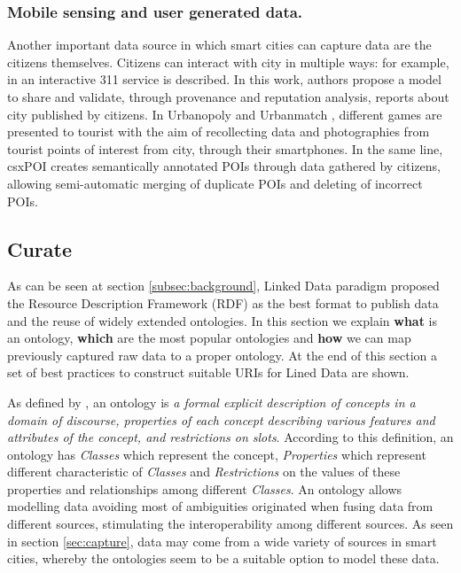 \subsubsection{Mobile sensing and user generated data.} Another important data source in which smart cities can capture data are the citizens themselves. Citizens can interact with city in multiple ways: for example, in \cite{emalditrust} an interactive 311 service is described. In this work, authors propose a model to share and validate, through provenance and reputation analysis, reports about city published by citizens. In Urbanopoly \cite{celino_urbanopoly_2012} and Urbanmatch \cite{celino_urbanmatch_2012}, different games are presented to tourist with the aim of recollecting data and photographies from tourist points of interest from city, through their smartphones. In the same line, csxPOI \cite{braun_collaborative_2010} creates semantically annotated POIs through data gathered by citizens, allowing semi-automatic merging of duplicate POIs and deleting of incorrect POIs.

\subsection{Curate}
\label{subsec:process}

As can be seen at section \ref{subsec:background}, Linked Data paradigm proposed the Resource Description Framework (RDF) as the best format to publish data and the reuse of widely extended ontologies. In this section we explain \textbf{what} is an ontology, \textbf{which} are the most popular ontologies and \textbf{how} we can map previously captured raw data to a proper ontology. At the end of this section a set of best practices to construct suitable URIs for Lined Data are shown.

As defined by \cite{noy_ontology_2001}, an ontology is \textit{a formal explicit description of concepts in a domain of discourse, properties of each concept describing various features and attributes of the concept, and restrictions on slots}. According to this definition, an ontology has \textit{Classes} which represent the concept, \textit{Properties} which represent different characteristic of \textit{Classes} and \textit{Restrictions} on the values of these properties and relationships among different \textit{Classes}. An ontology allows modelling data avoiding most of ambiguities originated when fusing data from different sources, stimulating the interoperability among different sources. As seen in section \ref{sec:capture}, data may come from a wide variety of sources in smart cities, whereby the ontologies seem to be a suitable option to model these data.

